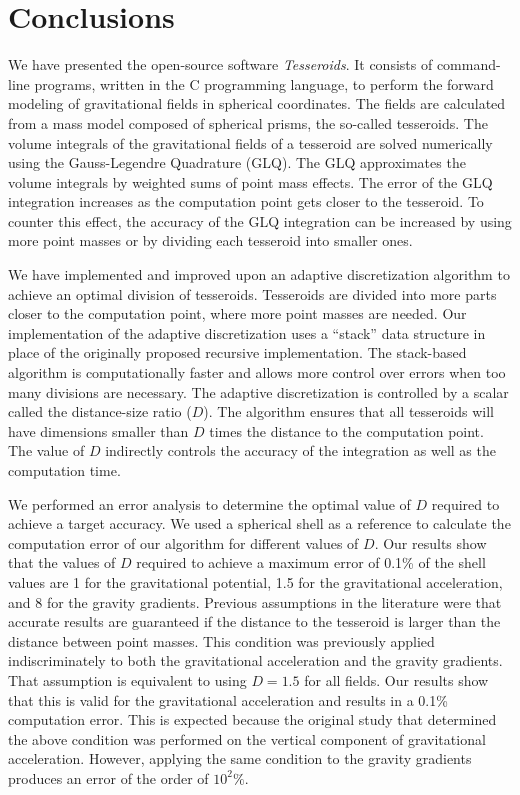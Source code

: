 \documentclass[paper,twocolumn,twoside]{geophysics}
\begin{document}
\section{Conclusions}


We have presented the open-source software \emph{Tesseroids}.
It consists of command-line programs,
written in the C programming language,
to perform the forward modeling of gravitational fields in spherical
coordinates.
The fields are calculated from a mass model composed of spherical prisms, the
so-called tesseroids.
The volume integrals of the gravitational fields of a tesseroid are solved
numerically using the Gauss-Legendre Quadrature (GLQ).
The GLQ approximates the volume integrals by weighted sums of point mass
effects.
The error of the GLQ integration increases as the computation point gets closer
to the tesseroid.
To counter this effect,
the accuracy of the GLQ integration can be increased by using more point
masses or by dividing each tesseroid into smaller ones.


We have implemented and improved upon an adaptive discretization algorithm to
achieve an optimal division of tesseroids.
Tesseroids are divided into more parts closer to the computation point,
where more point masses are needed.
Our implementation of the adaptive discretization uses a ``stack'' data
structure in place of the originally proposed recursive implementation.
The stack-based algorithm is computationally faster and allows more control
over errors when too many divisions are necessary.
The adaptive discretization is controlled by
a scalar called the distance-size ratio ($D$).
The algorithm ensures that all tesseroids will
have dimensions smaller than $D$ times the distance to the computation point.
The value of $D$ indirectly controls the accuracy of the integration as well as
the computation time.


We performed an error analysis to determine
the optimal value of $D$ required to achieve a target accuracy.
We used a spherical shell as a reference to calculate the computation error of
our algorithm for different values of $D$.
Our results show that the values of $D$ required to achieve a maximum error
of 0.1\% of the shell values are
1 for the gravitational potential, 1.5 for the gravitational acceleration,
and 8 for the gravity gradients.
Previous assumptions in the literature
were that accurate results are guaranteed if
the distance to the tesseroid is larger than
the distance between point masses.
This condition was previously applied indiscriminately
to both the gravitational acceleration and the gravity gradients.
That assumption is equivalent to using $D=1.5$ for all fields.
Our results show that this is valid for the gravitational
acceleration and results in a 0.1\% computation error.
This is expected because the original study that determined the above condition
was performed on the vertical component of gravitational acceleration.
However, applying the same condition to the gravity gradients produces
an error of the order of $10^2\%$.
\end{document}
